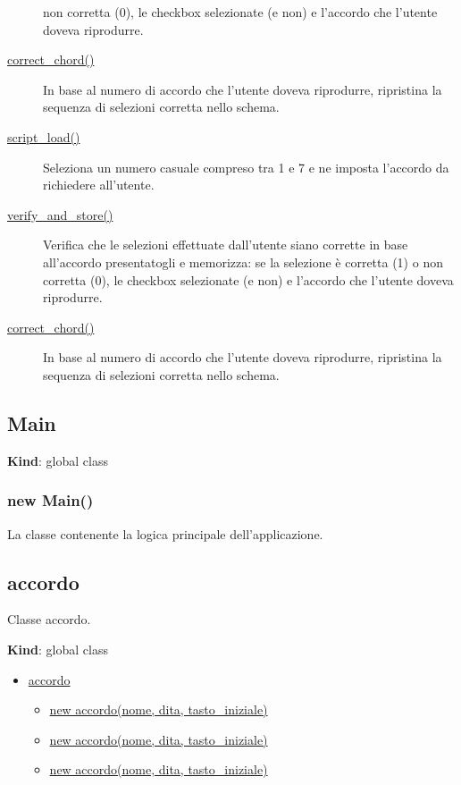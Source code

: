 \begin{description}
non corretta (0), le checkbox selezionate (e non) e l'accordo che
l'utente doveva riprodurre.
\item[{ \protect\hyperlink{correct_chord}{correct\_chord()} }]
In base al numero di accordo che l'utente doveva riprodurre, ripristina
la sequenza di selezioni corretta nello schema.
\item[{ \protect\hyperlink{script_load}{script\_load()} }]
Seleziona un numero casuale compreso tra 1 e 7 e ne imposta l'accordo da
richiedere all'utente.
\item[{ \protect\hyperlink{verify_and_store}{verify\_and\_store()} }]
Verifica che le selezioni effettuate dall'utente siano corrette in base
all'accordo presentatogli e memorizza: se la selezione è corretta (1) o
non corretta (0), le checkbox selezionate (e non) e l'accordo che
l'utente doveva riprodurre.
\item[{ \protect\hyperlink{correct_chord}{correct\_chord()} }]
In base al numero di accordo che l'utente doveva riprodurre, ripristina
la sequenza di selezioni corretta nello schema.
\end{description}

\protect\hypertarget{Main}{}{}

\hypertarget{main}{%
\subsection{Main}\label{main}}

\textbf{Kind}: global class\\
\protect\hypertarget{new_Main_new}{}{}

\hypertarget{new-main}{%
\subsubsection{new Main()}\label{new-main}}

La classe contenente la logica principale dell'applicazione.

\protect\hypertarget{accordo}{}{}

\hypertarget{accordo}{%
\subsection{accordo}\label{accordo}}

Classe accordo.

\textbf{Kind}: global class

\begin{itemize}
\tightlist
\item
  \protect\hyperlink{accordo}{accordo}

  \begin{itemize}
  \tightlist
  \item
    \protect\hyperlink{new_accordo_new}{new accordo(nome, dita,
    tasto\_iniziale)}
  \item
    \protect\hyperlink{new_accordo_new}{new accordo(nome, dita,
    tasto\_iniziale)}
  \item
    \protect\hyperlink{new_accordo_new}{new accordo(nome, dita,
    tasto\_iniziale)}
  \end{itemize}
\end{itemize}

